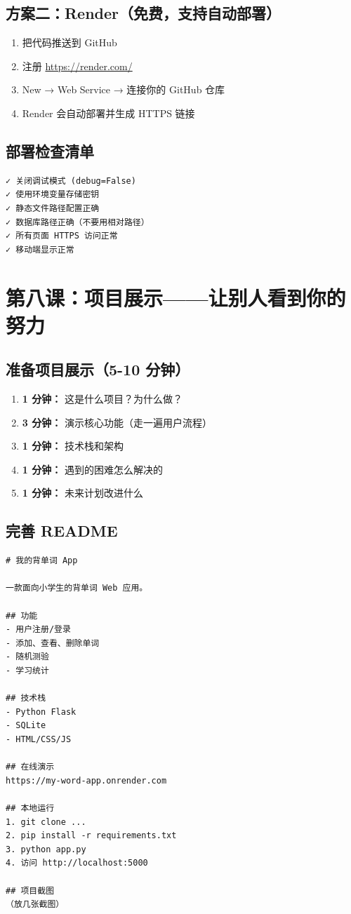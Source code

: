 \documentclass[a4paper,12pt]{ctexart}
\begin{document}
\subsection*{方案二：Render（免费，支持自动部署）}

\begin{enumerate}
  \item 把代码推送到 GitHub
  \item 注册 \url{https://render.com/}
  \item New → Web Service → 连接你的 GitHub 仓库
  \item Render 会自动部署并生成 HTTPS 链接
\end{enumerate}

\subsection*{部署检查清单}

\begin{lstlisting}
✓ 关闭调试模式 (debug=False)
✓ 使用环境变量存储密钥
✓ 静态文件路径配置正确
✓ 数据库路径正确（不要用相对路径）
✓ 所有页面 HTTPS 访问正常
✓ 移动端显示正常
\end{lstlisting}

\section*{第八课：项目展示——让别人看到你的努力}

\subsection*{准备项目展示（5-10 分钟）}

\begin{enumerate}
  \item \textbf{1 分钟：} 这是什么项目？为什么做？
  \item \textbf{3 分钟：} 演示核心功能（走一遍用户流程）
  \item \textbf{1 分钟：} 技术栈和架构
  \item \textbf{1 分钟：} 遇到的困难怎么解决的
  \item \textbf{1 分钟：} 未来计划改进什么
\end{enumerate}

\subsection*{完善 README}

\begin{lstlisting}
# 我的背单词 App

一款面向小学生的背单词 Web 应用。

## 功能
- 用户注册/登录
- 添加、查看、删除单词
- 随机测验
- 学习统计

## 技术栈
- Python Flask
- SQLite
- HTML/CSS/JS

## 在线演示
https://my-word-app.onrender.com

## 本地运行
1. git clone ...
2. pip install -r requirements.txt
3. python app.py
4. 访问 http://localhost:5000

## 项目截图
（放几张截图）
\end{lstlisting}
\end{document}

